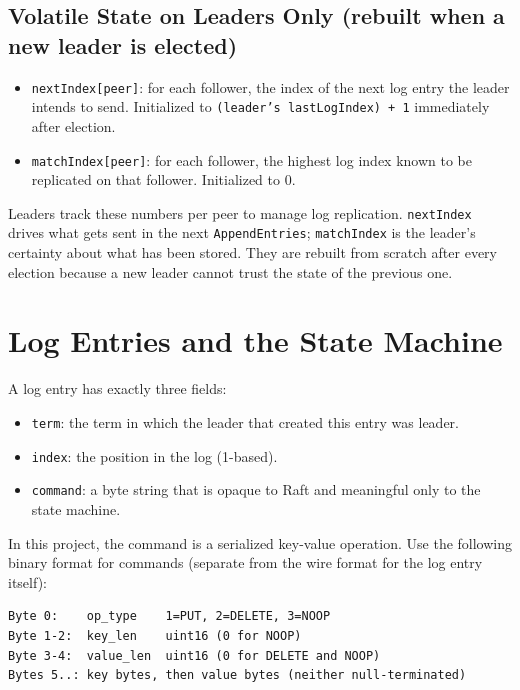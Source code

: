 \documentclass[11pt,a4paper]{article}
\begin{document}
\subsection{Volatile State on Leaders Only (rebuilt when a new leader is elected)}
\begin{itemize}
\item \texttt{nextIndex[peer]}: for each follower, the index of the next log entry the leader intends to send. Initialized to \texttt{(leader's lastLogIndex) + 1} immediately after election.
\item \texttt{matchIndex[peer]}: for each follower, the highest log index known to be replicated on that follower. Initialized to 0.
\end{itemize}

Leaders track these numbers per peer to manage log replication. \texttt{nextIndex} drives what gets sent in the next \texttt{AppendEntries}; \texttt{matchIndex} is the leader's certainty about what has been stored. They are rebuilt from scratch after every election because a new leader cannot trust the state of the previous one.

\section{Log Entries and the State Machine}

A log entry has exactly three fields:

\begin{itemize}
\item \texttt{term}: the term in which the leader that created this entry was leader.
\item \texttt{index}: the position in the log (1-based).
\item \texttt{command}: a byte string that is opaque to Raft and meaningful only to the state machine.
\end{itemize}

In this project, the command is a serialized key-value operation. Use the following binary format for commands (separate from the wire format for the log entry itself):

\begin{codebox}
\begin{lstlisting}
Byte 0:    op_type    1=PUT, 2=DELETE, 3=NOOP
Byte 1-2:  key_len    uint16 (0 for NOOP)
Byte 3-4:  value_len  uint16 (0 for DELETE and NOOP)
Bytes 5..: key bytes, then value bytes (neither null-terminated)
\end{lstlisting}
\end{codebox}
\end{document}
